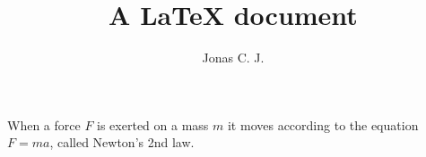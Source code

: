 \documentclass[a4paper, 12pt]{article}
\title{A \LaTeX{} document}
\author{Jonas C. J.}
\begin{document}
When a force $F$ is exerted on a mass $m$ it moves according to the equation $F=ma$, called Newton's 2nd law\cite{essentialphysics}.



\end{document}
